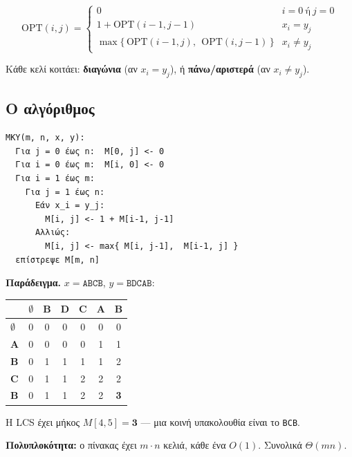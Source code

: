 \documentclass[11pt,a4paper]{article}
\begin{document}
\begin{keypoint}
\[
\text{OPT}(i, j) =
\begin{cases}
0 & i = 0 \ \text{ή}\ j = 0 \\[4pt]
1 + \text{OPT}(i-1, j-1) & x_i = y_j \\[4pt]
\max\bigl\{\, \text{OPT}(i-1, j),\ \ \text{OPT}(i, j-1) \,\bigr\} & x_i \ne y_j
\end{cases}
\]
\end{keypoint}

Κάθε κελί κοιτάει: \textbf{διαγώνια} (αν $x_i = y_j$), ή \textbf{πάνω/αριστερά}
(αν $x_i \ne y_j$).

\subsection{Ο αλγόριθμος}

\begin{codebox}
\begin{verbatim}
ΜΚΥ(m, n, x, y):
  Για j = 0 έως n:  M[0, j] <- 0
  Για i = 0 έως m:  M[i, 0] <- 0
  Για i = 1 έως m:
    Για j = 1 έως n:
      Εάν x_i = y_j:
        M[i, j] <- 1 + M[i-1, j-1]
      Αλλιώς:
        M[i, j] <- max{ M[i, j-1],  M[i-1, j] }
  επίστρεψε M[m, n]
\end{verbatim}
\end{codebox}

\textbf{Παράδειγμα.} $x = \texttt{ABCB}$, $y = \texttt{BDCAB}$:

\begin{center}
\begin{tabular}{@{}l *{6}{c}@{}}
\toprule
 & $\emptyset$ & B & D & C & A & B \\
\midrule
\textbf{$\emptyset$} & 0 & 0 & 0 & 0 & 0 & 0 \\
\textbf{A}           & 0 & 0 & 0 & 0 & 1 & 1 \\
\textbf{B}           & 0 & 1 & 1 & 1 & 1 & 2 \\
\textbf{C}           & 0 & 1 & 1 & 2 & 2 & 2 \\
\textbf{B}           & 0 & 1 & 1 & 2 & 2 & \textbf{3} \\
\bottomrule
\end{tabular}
\end{center}

Η LCS έχει μήκος $M[4,5] = \mathbf{3}$ --- μια κοινή υπακολουθία είναι το
\texttt{BCB}.

\textbf{Πολυπλοκότητα:} ο πίνακας έχει $m \cdot n$ κελιά, κάθε ένα $O(1)$.
Συνολικά \textbf{$\Theta(mn)$}.
\end{document}
